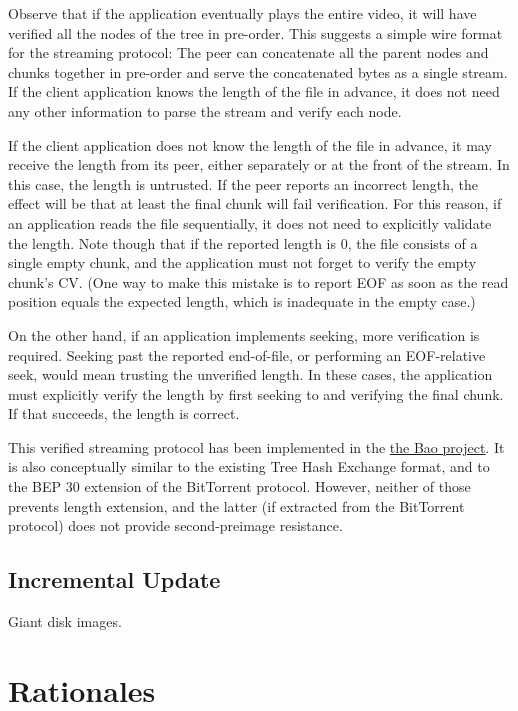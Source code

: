 \documentclass[11pt,notitlepage,a4paper]{article}
\begin{document}
Observe that if the application eventually plays the entire video, it will have
verified all the nodes of the tree in pre-order. This suggests a simple wire
format for the streaming protocol: The peer can concatenate all the parent
nodes and chunks together in pre-order and serve the concatenated bytes as a
single stream. If the client application knows the length of the file in
advance, it does not need any other information to parse the stream and verify
each node.

If the client application does not know the length of the file in advance, it
may receive the length from its peer, either separately or at the front of the
stream. In this case, the length is untrusted. If the peer reports an incorrect
length, the effect will be that at least the final chunk will fail
verification. For this reason, if an application reads the file sequentially,
it does not need to explicitly validate the length. Note though that if the
reported length is 0, the file consists of a single empty chunk, and the
application must not forget to verify the empty chunk's CV. (One way to make
this mistake is to report EOF as soon as the read position equals the expected
length, which is inadequate in the empty case.)

On the other hand, if an application implements seeking, more verification is
required. Seeking past the reported end-of-file, or performing an EOF-relative
seek, would mean trusting the unverified length. In these cases, the
application must explicitly verify the length by first seeking to and verifying
the final chunk. If that succeeds, the length is correct.

This verified streaming protocol has been implemented in the
\href{https://github.com/oconnor663/bao}{the Bao project}. It is also
conceptually similar to the existing Tree Hash Exchange format, and to the BEP
30 extension of the BitTorrent protocol. However, neither of those prevents
length extension, and the latter (if extracted from the BitTorrent protocol)
does not provide second-preimage resistance.
\cite{DBLP:journals/ijisec/BertoniDPA14}

\subsection{Incremental Update}\label{sec:incrementalupdate}

Giant disk images.

\section{Rationales}\label{sec:rationales}
\end{document}
